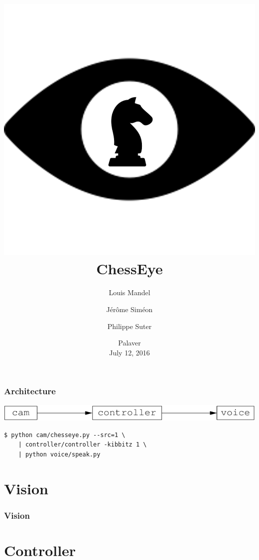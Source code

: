 \documentclass[t]{beamer}
\title{\includegraphics[scale=0.1]{figures/chesseye}
  \\
  ChessEye}
\author{Louis Mandel \and J{\'e}r{\^o}me Sim{\'e}on \and Philippe Suter}
\date{Palaver \\ July 12, 2016}
\begin{document}

\begin{frame}
  \titlepage
\end{frame}




\begin{frame}[fragile]
\frametitle{Architecture}

\begin{center}
  \includegraphics[scale=0.9]{figures/architecture}
\end{center}
\medskip

{\small
\begin{verbatim}
$ python cam/chesseye.py --src=1 \
    | controller/controller -kibbitz 1 \
    | python voice/speak.py
\end{verbatim}
}

\end{frame}


\section{Vision}

\begin{frame}[fragile]
\frametitle{Vision}


\end{frame}


\section{Controller}
\end{document}
